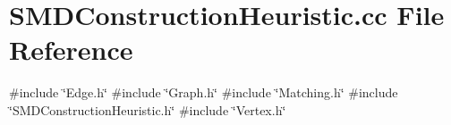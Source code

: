 \section{S\+M\+D\+Construction\+Heuristic.\+cc File Reference}
\label{SMDConstructionHeuristic_8cc}
{\ttfamily \#include \char`\"{}Edge.\+h\char`\"{}}\newline
{\ttfamily \#include \char`\"{}Graph.\+h\char`\"{}}\newline
{\ttfamily \#include \char`\"{}Matching.\+h\char`\"{}}\newline
{\ttfamily \#include \char`\"{}S\+M\+D\+Construction\+Heuristic.\+h\char`\"{}}\newline
{\ttfamily \#include \char`\"{}Vertex.\+h\char`\"{}}\newline
